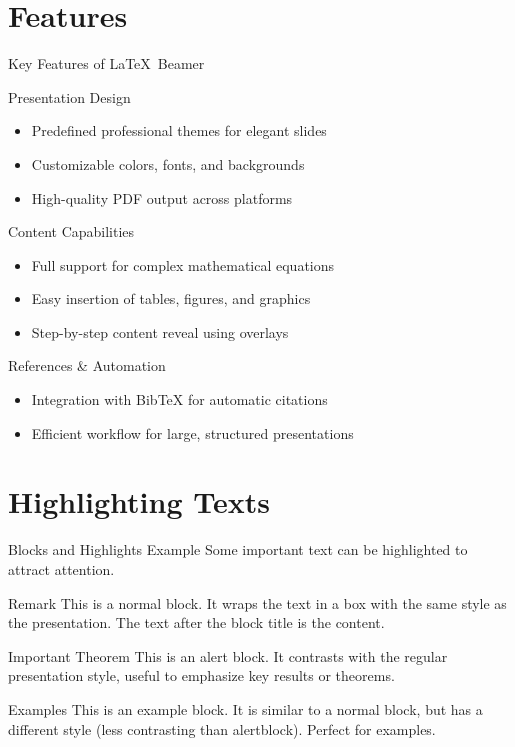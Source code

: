 \documentclass{beamer}
\begin{document}
	\section{Features}
	\begin{frame}{Key Features of \LaTeX\ Beamer}
		\begin{block}{Presentation Design}
			\begin{itemize}
				\item<1-> Predefined professional themes for elegant slides
				\item<2-> Customizable colors, fonts, and backgrounds
				\item<3-> High-quality PDF output across platforms
			\end{itemize}
		\end{block}
		\begin{block}{Content Capabilities}
			\begin{itemize}
				\item<4-> Full support for complex mathematical equations
				\item<5-> Easy insertion of tables, figures, and graphics
				\item<6-> Step-by-step content reveal using overlays
			\end{itemize}
		\end{block}
		\begin{block}{References \& Automation}
			\begin{itemize}
				\item<7-> Integration with Bib\TeX{} for automatic citations
				\item<8-> Efficient workflow for large, structured presentations
			\end{itemize}
		\end{block}
	\end{frame}
	
	\section{Highlighting Texts}
	\begin{frame}{Blocks and Highlights Example}
		Some important text can be \alert{highlighted} to attract attention.
		\begin{block}{Remark}
			This is a normal block. It wraps the text in a box with the same style as
			the presentation. The text after the block title is the content.
		\end{block}
		\begin{alertblock}{Important Theorem}
			This is an alert block. It contrasts with the regular presentation style,
			useful to emphasize key results or theorems.
		\end{alertblock}
		\begin{exampleblock}{Examples}
			This is an example block. It is similar to a normal block, but has a
			different style (less contrasting than alertblock). Perfect for examples.
		\end{exampleblock}
	\end{frame}
	
\end{document}
